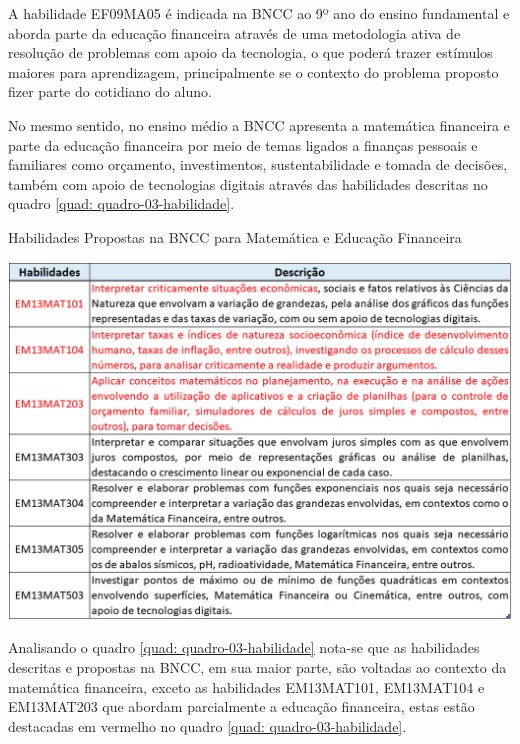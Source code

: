 A habilidade EF09MA05 é indicada na BNCC ao 9º ano do ensino fundamental e aborda parte da educação financeira através de uma metodologia ativa de resolução de problemas com apoio da tecnologia, o que poderá trazer estímulos maiores para aprendizagem, principalmente se o contexto do problema proposto fizer parte do cotidiano do aluno.

No mesmo sentido, no ensino médio a BNCC apresenta a matemática financeira e parte da educação financeira por meio de temas ligados a finanças pessoais e familiares como orçamento, investimentos, sustentabilidade e tomada de decisões, também com apoio de tecnologias digitais através das habilidades descritas no quadro \ref{quad: quadro-03-habilidade}.

\graphicspath{{quadros/}}
\begin{quadro}[!ht]
\centering
\begin{minipage}{1.\textwidth}
\caption{Habilidades Propostas na BNCC para Matemática  e Educação Financeira}
\centering
\includegraphics[width=1\textwidth]{quadro-03-habilidades.png}
\label{quad: quadro-03-habilidade}
\end{minipage}
\end{quadro}

\newpage
Analisando o quadro \ref{quad: quadro-03-habilidade} nota-se que as habilidades descritas e propostas na BNCC, em sua maior parte, são voltadas ao contexto da matemática financeira, exceto as habilidades EM13MAT101, EM13MAT104 e EM13MAT203 que abordam parcialmente a educação financeira, estas estão destacadas em vermelho no quadro \ref{quad: quadro-03-habilidade}.

